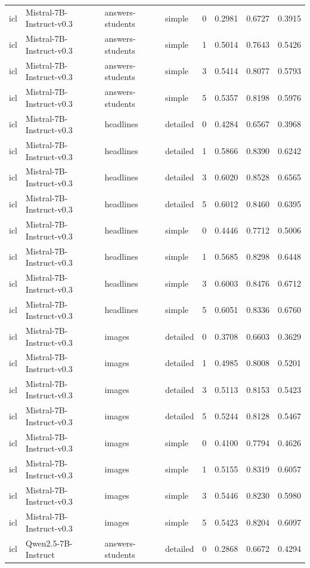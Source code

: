 \begin{longtable}{llllrrrr}
icl & Mistral-7B-Instruct-v0.3 & answers-students & simple & 0 & 0.2981 & 0.6727 & 0.3915 \\
icl & Mistral-7B-Instruct-v0.3 & answers-students & simple & 1 & 0.5014 & 0.7643 & 0.5426 \\
icl & Mistral-7B-Instruct-v0.3 & answers-students & simple & 3 & 0.5414 & 0.8077 & 0.5793 \\
icl & Mistral-7B-Instruct-v0.3 & answers-students & simple & 5 & 0.5357 & 0.8198 & 0.5976 \\
icl & Mistral-7B-Instruct-v0.3 & headlines & detailed & 0 & 0.4284 & 0.6567 & 0.3968 \\
icl & Mistral-7B-Instruct-v0.3 & headlines & detailed & 1 & 0.5866 & 0.8390 & 0.6242 \\
icl & Mistral-7B-Instruct-v0.3 & headlines & detailed & 3 & 0.6020 & 0.8528 & 0.6565 \\
icl & Mistral-7B-Instruct-v0.3 & headlines & detailed & 5 & 0.6012 & 0.8460 & 0.6395 \\
icl & Mistral-7B-Instruct-v0.3 & headlines & simple & 0 & 0.4446 & 0.7712 & 0.5006 \\
icl & Mistral-7B-Instruct-v0.3 & headlines & simple & 1 & 0.5685 & 0.8298 & 0.6448 \\
icl & Mistral-7B-Instruct-v0.3 & headlines & simple & 3 & 0.6003 & 0.8476 & 0.6712 \\
icl & Mistral-7B-Instruct-v0.3 & headlines & simple & 5 & 0.6051 & 0.8336 & 0.6760 \\
icl & Mistral-7B-Instruct-v0.3 & images & detailed & 0 & 0.3708 & 0.6603 & 0.3629 \\
icl & Mistral-7B-Instruct-v0.3 & images & detailed & 1 & 0.4985 & 0.8008 & 0.5201 \\
icl & Mistral-7B-Instruct-v0.3 & images & detailed & 3 & 0.5113 & 0.8153 & 0.5423 \\
icl & Mistral-7B-Instruct-v0.3 & images & detailed & 5 & 0.5244 & 0.8128 & 0.5467 \\
icl & Mistral-7B-Instruct-v0.3 & images & simple & 0 & 0.4100 & 0.7794 & 0.4626 \\
icl & Mistral-7B-Instruct-v0.3 & images & simple & 1 & 0.5155 & 0.8319 & 0.6057 \\
icl & Mistral-7B-Instruct-v0.3 & images & simple & 3 & 0.5446 & 0.8230 & 0.5980 \\
icl & Mistral-7B-Instruct-v0.3 & images & simple & 5 & 0.5423 & 0.8204 & 0.6097 \\
icl & Qwen2.5-7B-Instruct & answers-students & detailed & 0 & 0.2868 & 0.6672 & 0.4294 \\

\end{longtable}

